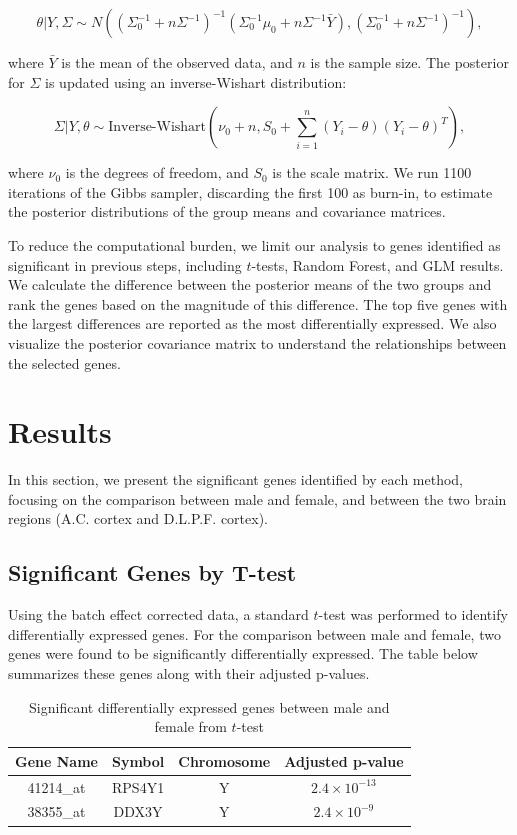 \documentclass[12pt]{article}
\begin{document}
\[
\theta | Y, \Sigma \sim N\left( \left(\Sigma_0^{-1} + n\Sigma^{-1}\right)^{-1}\left(\Sigma_0^{-1}\mu_0 + n\Sigma^{-1} \bar{Y}\right), \left(\Sigma_0^{-1} + n\Sigma^{-1}\right)^{-1} \right),
\]

where $\bar{Y}$ is the mean of the observed data, and $n$ is the sample size. The posterior for $\Sigma$ is updated using an inverse-Wishart distribution:

\[
\Sigma | Y, \theta \sim \text{Inverse-Wishart}(\nu_0 + n, S_0 + \sum_{i=1}^{n}(Y_i - \theta)(Y_i - \theta)^T),
\]

where $\nu_0$ is the degrees of freedom, and $S_0$ is the scale matrix. We run 1100 iterations of the Gibbs sampler, discarding the first 100 as burn-in, to estimate the posterior distributions of the group means and covariance matrices.

To reduce the computational burden, we limit our analysis to genes identified as significant in previous steps, including $t$-tests, Random Forest, and GLM results. We calculate the difference between the posterior means of the two groups and rank the genes based on the magnitude of this difference. The top five genes with the largest differences are reported as the most differentially expressed. We also visualize the posterior covariance matrix to understand the relationships between the selected genes.

\section{Results}

In this section, we present the significant genes identified by each method, focusing on the comparison between male and female, and between the two brain regions (A.C. cortex and D.L.P.F. cortex).

\subsection{Significant Genes by T-test}

Using the batch effect corrected data, a standard $t$-test was performed to identify differentially expressed genes. For the comparison between male and female, two genes were found to be significantly differentially expressed. The table below summarizes these genes along with their adjusted p-values.

\begin{table}[h!]
\centering
\begin{tabular}{|c|c|c|c|}
\hline
\textbf{Gene Name} & \textbf{Symbol} & \textbf{Chromosome} & \textbf{Adjusted p-value} \\
\hline
41214\_at & RPS4Y1 & Y & $2.4 \times 10^{-13}$ \\
38355\_at & DDX3Y & Y & $2.4 \times 10^{-9}$ \\
\hline
\end{tabular}
\caption{Significant differentially expressed genes between male and female from $t$-test}
\end{table}
\end{document}
